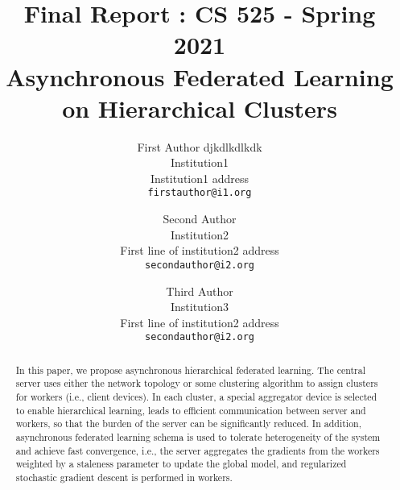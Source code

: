\documentclass[10pt,twocolumn,letterpaper]{article}
\theoremstyle{definition}
\begin{document}
\title{Final Report : CS 525 - Spring 2021\\
Asynchronous Federated Learning on Hierarchical Clusters}

\author{First Author djkdlkdlkdk\\
Institution1\\
Institution1 address\\
{\tt\small firstauthor@i1.org}
\and
Second Author\\
Institution2\\
First line of institution2 address\\
{\tt\small secondauthor@i2.org}


\and
Third Author\\
Institution3\\
First line of institution2 address\\
{\tt\small secondauthor@i2.org}
}

\maketitle

\begin{abstract}
In this paper, we propose asynchronous hierarchical federated learning. 
The central server uses either the network topology or some clustering algorithm to assign clusters for workers (i.e., client devices). In each cluster, a special aggregator device is selected to enable hierarchical learning, leads to efficient communication between server and workers, so that the burden of the server can be significantly reduced. In addition, asynchronous federated learning schema is used to tolerate heterogeneity of the system and achieve fast convergence, i.e., the server aggregates the gradients from the workers weighted by a staleness parameter to update the global model, and regularized stochastic gradient descent is performed in workers. 
\end{abstract}
\end{document}

